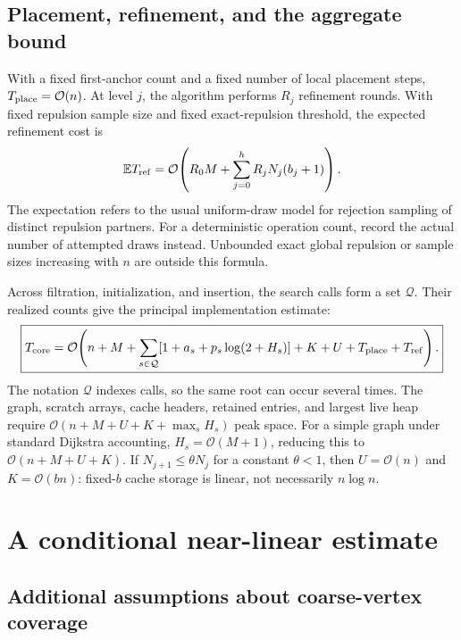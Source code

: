 \documentclass[11pt,a4paper]{article}
\newcommand{\bigO}{\mathcal O}
\begin{document}
\subsection{Placement, refinement, and the aggregate bound}

With a fixed first-anchor count and a fixed number of local placement steps,
$T_{\rm place}=\bigO(n)$. At level $j$, the algorithm performs $R_j$ refinement
rounds. With fixed repulsion sample size and fixed exact-repulsion threshold,
the expected refinement cost is
\begin{equation}
 \mathbb E T_{\rm ref}=\bigO\!\left(
   R_0M+\sum_{j=0}^{h}R_jN_j(b_j+1)\right).
 \label{eq:refine}
\end{equation}
The expectation refers to the usual uniform-draw model for rejection sampling
of distinct repulsion partners. For a deterministic operation count, record
the actual number of attempted draws instead. Unbounded exact global repulsion
or sample sizes increasing with $n$ are outside this formula.

Across filtration, initialization, and insertion, the search calls form a set
$\mathcal Q$. Their realized counts give the principal implementation estimate:
\begin{equation}
 \boxed{T_{\rm core}=\bigO\!\left(
 n+M+\sum_{s\in\mathcal Q}
 [1+a_s+p_s\log(2+H_s)]+K+U+T_{\rm place}+T_{\rm ref}\right).}
 \label{eq:total}
\end{equation}
The notation $\mathcal Q$ indexes calls, so the same root can occur several
times. The graph, scratch arrays, cache headers, retained entries, and largest
live heap require $\bigO(n+M+U+K+\max_s H_s)$ peak space. For a simple graph
under standard Dijkstra accounting, $H_s=\bigO(M+1)$, reducing this to
$\bigO(n+M+U+K)$. If $N_{j+1}\leq\theta N_j$ for a constant $\theta<1$, then
$U=\bigO(n)$ and $K=\bigO(bn)$: fixed-$b$ cache storage is linear, not
necessarily $n\log n$.

\clearpage
\section{A conditional near-linear estimate}

\subsection{Additional assumptions about coarse-vertex coverage}
\end{document}
